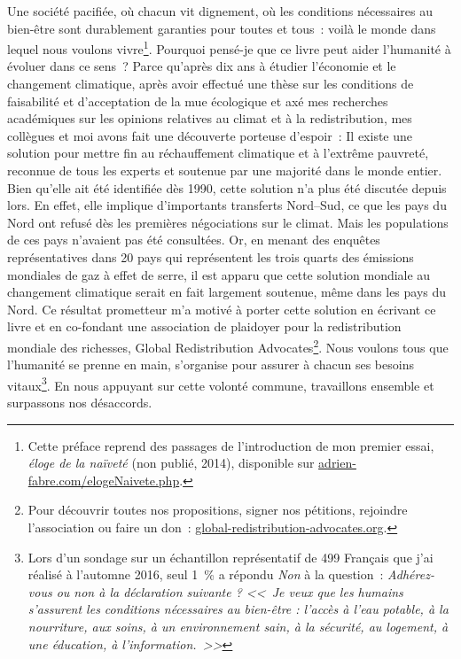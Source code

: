 \documentclass[a5paper,french,openany]{memoir}
\begin{document}
Une société pacifiée, où chacun vit dignement, où les conditions nécessaires au bien-être sont durablement garanties pour toutes et tous~: voilà le monde dans lequel nous voulons vivre\footnote{Cette préface reprend des passages de l'introduction de mon premier essai, \textit{éloge de la naïveté} (non publié, 2014), disponible sur \href{https://adrien-fabre.com/elogeNaivete.php}{adrien-fabre.com/elogeNaivete.php}.}. Pourquoi pensé-je que ce livre peut aider l'humanité à évoluer dans ce sens~? Parce qu'après dix ans à étudier l'économie et le changement climatique, après avoir effectué une thèse sur les conditions de faisabilité et d'acceptation de la mue écologique et axé mes recherches académiques sur les opinions relatives au climat et à la redistribution, mes collègues et moi avons fait une découverte porteuse d'espoir~:  
Il existe une solution pour mettre fin au réchauffement climatique et à l'extrême pauvreté, reconnue de %
tous les experts et soutenue par une majorité dans le monde entier. 
Bien qu'elle ait été identifiée dès 1990, cette solution n'a plus été discutée %
depuis lors. En effet, elle implique d'importants transferts Nord--Sud, ce que les pays du Nord ont refusé dès les premières négociations sur le climat. Mais les populations de ces pays n'avaient pas été consultées. Or, en menant des enquêtes représentatives dans 20 pays qui représentent les trois quarts des émissions mondiales de gaz à effet de serre, il est apparu que cette solution mondiale au changement climatique serait en fait largement soutenue, même dans les pays du Nord. 
Ce résultat prometteur m'a motivé à porter cette solution en écrivant ce livre et en co-fondant une association de plaidoyer pour la redistribution mondiale des richesses, Global Redistribution Advocates\footnote{Pour découvrir toutes nos propositions, signer nos pétitions, rejoindre l'association ou faire un don~: \href{http://global-redistribution-advocates.org/}{global-redistribution-advocates.org}.}. %
Nous voulons tous que l'humanité se prenne en main, s'organise 
pour assurer à chacun ses besoins vitaux\footnote{Lors d'un sondage sur un échantillon représentatif de 499 %
Français que j'ai réalisé à l'automne 2016, seul 1~\% a répondu \textit{Non} à la question~: \textit{Adhérez-vous ou non à la déclaration suivante ? <<~Je veux que les humains s'assurent les conditions nécessaires au bien-être : l'accès à l'eau potable, à la nourriture, aux soins, à un environnement sain, à la sécurité, au logement, à une éducation, à l'information.~>>}}. 
En nous appuyant sur cette volonté commune, travaillons ensemble et surpassons nos désaccords.
\end{document}
